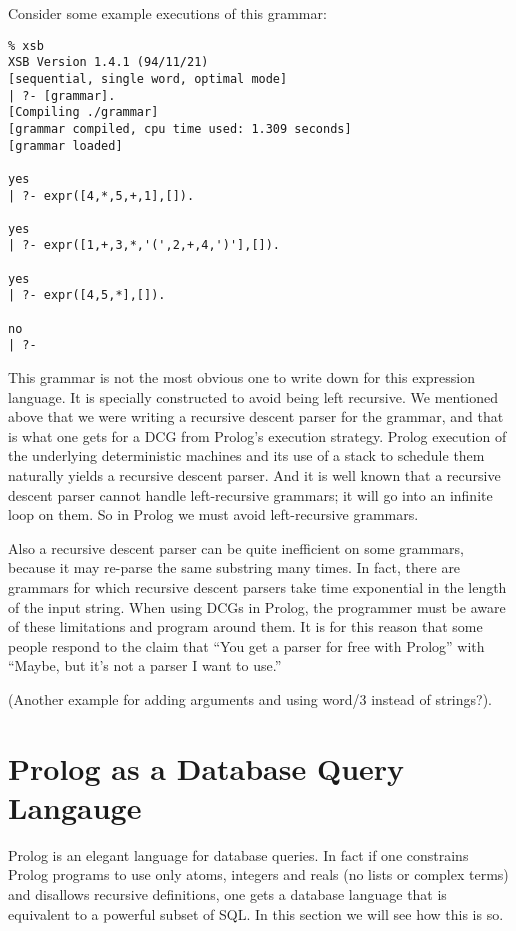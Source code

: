 Consider some example executions of this grammar:
\begin{verbatim}
% xsb
XSB Version 1.4.1 (94/11/21)
[sequential, single word, optimal mode]
| ?- [grammar].
[Compiling ./grammar]
[grammar compiled, cpu time used: 1.309 seconds]
[grammar loaded]

yes
| ?- expr([4,*,5,+,1],[]).

yes
| ?- expr([1,+,3,*,'(',2,+,4,')'],[]).

yes
| ?- expr([4,5,*],[]).

no
| ?- 
\end{verbatim}

This grammar is not the most obvious one to write down for this
expression language.  It is specially constructed to avoid being left
recursive.  We mentioned above that we were writing a recursive
descent parser for the grammar, and that is what one gets for a DCG
from Prolog's execution strategy.  Prolog execution of the underlying
deterministic machines and its use of a stack to schedule them
naturally yields a recursive descent parser.  And it is well known that
a recursive descent parser cannot handle left-recursive grammars; it
will go into an infinite loop on them.  So in Prolog we must avoid
left-recursive grammars.

Also a recursive descent parser can be quite inefficient on some
grammars, because it may re-parse the same substring many times.  In
fact, there are grammars for which recursive descent parsers take time
exponential in the length of the input string.  When using DCGs in
Prolog, the programmer must be aware of these limitations and program
around them.  It is for this reason that some people respond to the
claim that ``You get a parser for free with Prolog'' with ``Maybe, but
it's not a parser I want to use.''

(Another example for adding arguments and using word/3 instead of
strings?).

\section{Prolog as a Database Query Langauge}

Prolog is an elegant language for database queries.  In fact if one
constrains Prolog programs to use only atoms, integers and reals (no
lists or complex terms) and disallows recursive definitions, one gets
a database language that is equivalent to a powerful subset of SQL.
In this section we will see how this is so.

